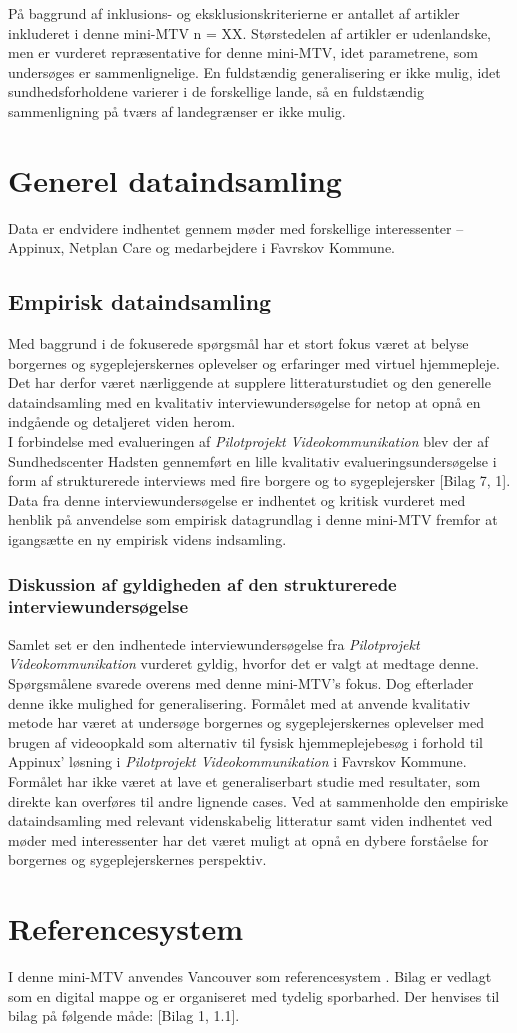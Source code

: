 På baggrund af inklusions- og eksklusionskriterierne er antallet af artikler inkluderet i denne mini-MTV n = XX. Størstedelen af artikler er udenlandske, men er vurderet repræsentative for denne mini-MTV, idet parametrene, som undersøges er sammenlignelige. En fuldstændig generalisering er ikke mulig, idet sundhedsforholdene varierer i de forskellige lande, så en fuldstændig sammenligning på tværs af landegrænser er ikke mulig. 

\section{Generel dataindsamling}
Data er endvidere indhentet gennem møder med forskellige interessenter – Appinux, Netplan Care og medarbejdere i Favrskov Kommune. 

\subsection{Empirisk dataindsamling}
Med baggrund i de fokuserede spørgsmål har et stort fokus været at belyse borgernes og sygeplejerskernes oplevelser og erfaringer med virtuel hjemmepleje. Det har derfor været nærliggende at supplere litteraturstudiet og den generelle dataindsamling med en kvalitativ interviewundersøgelse for netop at opnå en indgående og detaljeret viden herom.\\
I forbindelse med evalueringen af \textit{Pilotprojekt Videokommunikation} blev der af Sundhedscenter Hadsten gennemført en lille kvalitativ evalueringsundersøgelse i form af strukturerede interviews med fire borgere og to sygeplejersker [Bilag 7, 1]. Data fra denne interviewundersøgelse er indhentet og kritisk vurderet med henblik på anvendelse som empirisk datagrundlag i denne mini-MTV fremfor at igangsætte en ny empirisk videns indsamling.

\subsubsection{Diskussion af gyldigheden af den strukturerede interviewundersøgelse}
Samlet set er den indhentede interviewundersøgelse fra \textit{Pilotprojekt Videokommunikation} vurderet gyldig, hvorfor det er valgt at medtage denne. Spørgsmålene svarede overens med denne mini-MTV's fokus. Dog efterlader denne ikke mulighed for generalisering. Formålet med at anvende kvalitativ metode har været at undersøge borgernes og sygeplejerskernes oplevelser med brugen af videoopkald som alternativ til fysisk hjemmeplejebesøg i forhold til Appinux' løsning i \textit{Pilotprojekt Videokommunikation} i Favrskov Kommune. Formålet har ikke været at lave et generaliserbart studie med resultater, som direkte kan overføres til andre lignende cases. Ved at sammenholde den empiriske dataindsamling med relevant videnskabelig litteratur samt viden indhentet ved møder med interessenter har det været muligt at opnå en dybere forståelse for borgernes og sygeplejerskernes perspektiv. 


\section{Referencesystem}
I denne mini-MTV anvendes Vancouver som referencesystem \cite{vancouver}. Bilag er vedlagt som en digital mappe og er organiseret med tydelig sporbarhed. Der henvises til bilag på følgende måde: [Bilag 1, 1.1].


  
	

